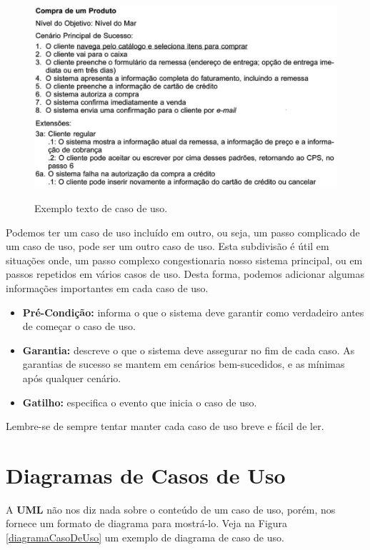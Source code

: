 \documentclass[a4paper, 12pt]{report}
\begin{document}
	
	\begin{figure}[H]
		\centering
		\includegraphics[scale=0.5]{casoDeUso.png}
		\label{CasoDeUsoProduto}
		\caption{Exemplo texto de caso de uso.}
	\end{figure}


	Podemos ter um caso de uso incluído em outro, ou seja, um passo complicado de um caso de uso, pode ser um outro caso de uso. Esta subdivisão é útil em situações onde, um passo complexo congestionaria nosso sistema principal, ou em passos repetidos em vários casos de uso. Desta forma, podemos adicionar algumas informações importantes em cada caso de uso.
	
	\begin{itemize}
		\item \textbf{Pré-Condição:} informa o que o sistema deve garantir como verdadeiro antes de começar o caso de uso.
		
		\item \textbf{Garantia:} descreve o que o sistema deve assegurar no fim de cada caso. As garantias de sucesso se mantem em cenários bem-sucedidos, e as mínimas após qualquer cenário.
		
		\item \textbf{Gatilho:} especifica o evento que inicia o caso de uso.
	\end{itemize}

	Lembre-se de sempre tentar manter cada caso de uso breve e fácil de ler.
	
	
	\section{Diagramas de Casos de Uso}
	
	A \textbf{UML} não nos diz nada sobre o conteúdo de um caso de uso, porém, nos fornece um formato de diagrama para mostrá-lo. Veja na Figura \ref{diagramaCasoDeUso} um exemplo de diagrama de caso de uso.
	
\end{document}
